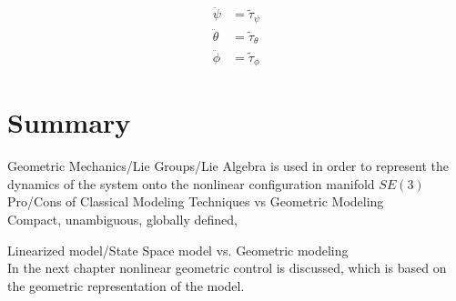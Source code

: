 \begin{align}\label{key}
	\ddot{\psi}&=\tilde{\tau}_{\psi}\\
\ddot{\theta}&=\tilde{\tau}_{\theta}\\
\ddot{\phi} &=\tilde{\tau}_{\phi}
\end{align}

\section*{Summary}

Geometric Mechanics/Lie Groups/Lie Algebra is used in order to represent the dynamics of the system onto the nonlinear configuration manifold $ SE(3) $\\

Pro/Cons of Classical Modeling Techniques vs Geometric Modeling\\

Compact, unambiguous, globally defined, 

Linearized model/State Space model vs. Geometric modeling\\

In the next chapter nonlinear geometric control is discussed, which is based on the geometric representation of the model. 
